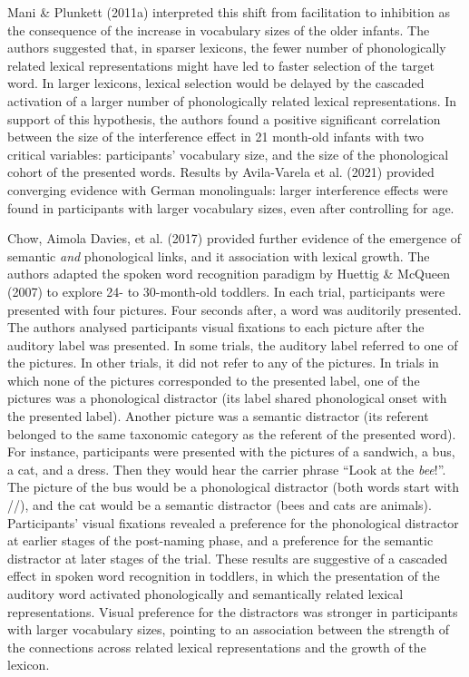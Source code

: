 \documentclass[
  12pt,
  b5paperpaper,
  twoside]{scrreprt}
\begin{document}
Mani \& Plunkett (2011a) interpreted this shift from facilitation to
inhibition as the consequence of the increase in vocabulary sizes of the
older infants. The authors suggested that, in sparser lexicons, the
fewer number of phonologically related lexical representations might
have led to faster selection of the target word. In larger lexicons,
lexical selection would be delayed by the cascaded activation of a
larger number of phonologically related lexical representations. In
support of this hypothesis, the authors found a positive significant
correlation between the size of the interference effect in 21 month-old
infants with two critical variables: participants' vocabulary size, and
the size of the phonological cohort of the presented words. Results by
Avila-Varela et al. (2021) provided converging evidence with German
monolinguals: larger interference effects were found in participants
with larger vocabulary sizes, even after controlling for age.

Chow, Aimola Davies, et al. (2017) provided further evidence of the
emergence of semantic \emph{and} phonological links, and it association
with lexical growth. The authors adapted the spoken word recognition
paradigm by Huettig \& McQueen (2007) to explore 24- to 30-month-old
toddlers. In each trial, participants were presented with four pictures.
Four seconds after, a word was auditorily presented. The authors
analysed participants visual fixations to each picture after the
auditory label was presented. In some trials, the auditory label
referred to one of the pictures. In other trials, it did not refer to
any of the pictures. In trials in which none of the pictures
corresponded to the presented label, one of the pictures was a
phonological distractor (its label shared phonological onset with the
presented label). Another picture was a semantic distractor (its
referent belonged to the same taxonomic category as the referent of the
presented word). For instance, participants were presented with the
pictures of a sandwich, a bus, a cat, and a dress. Then they would hear
the carrier phrase ``Look at the \emph{bee}!''. The picture of the bus
would be a phonological distractor (both words start with
//), and the cat would be a semantic distractor (bees and
cats are animals). Participants' visual fixations revealed a preference
for the phonological distractor at earlier stages of the post-naming
phase, and a preference for the semantic distractor at later stages of
the trial. These results are suggestive of a cascaded effect in spoken
word recognition in toddlers, in which the presentation of the auditory
word activated phonologically and semantically related lexical
representations. Visual preference for the distractors was stronger in
participants with larger vocabulary sizes, pointing to an association
between the strength of the connections across related lexical
representations and the growth of the lexicon.
\end{document}
